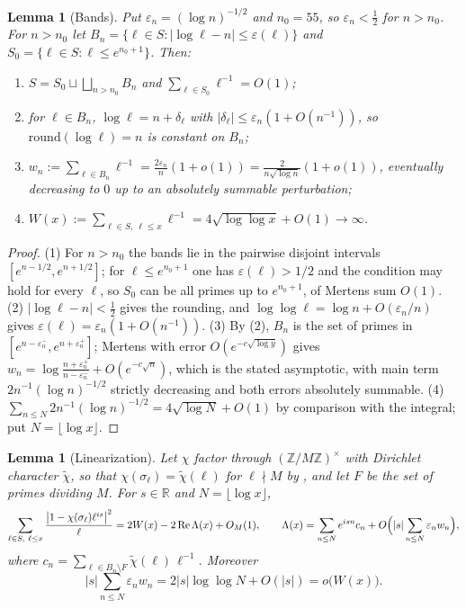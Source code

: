 \documentclass[11pt]{amsart}
\numberwithin{equation}{section}
\newtheorem{lemma}[theorem]{Lemma}
\theoremstyle{definition}
\theoremstyle{remark}
\newcommand{\Z}{\mathbb{Z}}
\newcommand{\R}{\mathbb{R}}
\begin{document}
\begin{lemma}[Bands]\label{lem:bands}
Put $\varepsilon_n=(\log n)^{-1/2}$ and $n_0=55$, so $\varepsilon_n<\tfrac12$ for $n>n_0$.
For $n>n_0$ let $B_n=\{\ell\in S:|\log\ell-n|\le\varepsilon(\ell)\}$ and
$S_0=\{\ell\in S:\ell\le e^{n_0+1}\}$. Then:
\begin{enumerate}
\item $S=S_0\sqcup\bigsqcup_{n>n_0}B_n$ and $\sum_{\ell\in S_0}\ell^{-1}=O(1)$;
\item for $\ell\in B_n$, $\log\ell=n+\delta_\ell$ with $|\delta_\ell|\le\varepsilon_n(1+O(n^{-1}))$,
so $\mathrm{round}(\log\ell)=n$ is constant on $B_n$;
\item $w_n:=\sum_{\ell\in B_n}\ell^{-1}=\frac{2\varepsilon_n}{n}(1+o(1))=\frac{2}{n\sqrt{\log n}}(1+o(1))$,
eventually decreasing to $0$ up to an absolutely summable perturbation;
\item $W(x):=\sum_{\ell\in S,\ \ell\le x}\ell^{-1}=4\sqrt{\log\log x}+O(1)\to\infty$.
\end{enumerate}
\end{lemma}

\begin{proof}
(1) For $n>n_0$ the bands lie in the pairwise disjoint intervals $[e^{n-1/2},e^{n+1/2}]$;
for $\ell\le e^{n_0+1}$ one has $\varepsilon(\ell)>1/2$ and the condition may hold for every
$\ell$, so $S_0$ can be all primes up to $e^{n_0+1}$, of Mertens sum $O(1)$.
(2) $|\log\ell-n|<\tfrac12$ gives the rounding, and
$\log\log\ell=\log n+O(\varepsilon_n/n)$ gives $\varepsilon(\ell)=\varepsilon_n(1+O(n^{-1}))$.
(3) By (2), $B_n$ is the set of primes in $[e^{n-\varepsilon_n^-},e^{n+\varepsilon_n^+}]$;
Mertens with error $O(e^{-c\sqrt{\log y}})$ gives
$w_n=\log\frac{n+\varepsilon_n^+}{n-\varepsilon_n^-}+O(e^{-c\sqrt n})$, which is the stated
asymptotic, with main term $2n^{-1}(\log n)^{-1/2}$ strictly decreasing and both errors
absolutely summable.
(4) $\sum_{n\le N}2n^{-1}(\log n)^{-1/2}=4\sqrt{\log N}+O(1)$ by comparison with the
integral; put $N=\lfloor\log x\rfloor$.
\end{proof}

\begin{lemma}[Linearization]\label{lem:lin}
Let $\chi$ factor through $(\Z/M\Z)^\times$ with Dirichlet character $\tilde\chi$, so that
$\chi(\sigma_\ell)=\tilde\chi(\ell)$ for $\ell\nmid M$ by \cite[Lem.~2.10(1)]{Main}, and let
$F$ be the set of primes dividing $M$. For $s\in\R$ and $N=\lfloor\log x\rfloor$,
\begin{equation}\label{eq:linear}
\sum_{\ell\in S,\ \ell\le x}\frac{\bigl|1-\chi(\sigma_\ell)\ell^{is}\bigr|^2}{\ell}
=2W(x)-2\operatorname{Re}\Lambda(x)+O_M(1),
\qquad
\Lambda(x)=\sum_{n\le N}e^{isn}c_n+O\Bigl(|s|\sum_{n\le N}\varepsilon_nw_n\Bigr),
\end{equation}
where $c_n=\sum_{\ell\in B_n\setminus F}\tilde\chi(\ell)\,\ell^{-1}$. Moreover
\begin{equation}\label{eq:err}
|s|\sum_{n\le N}\varepsilon_nw_n=2|s|\log\log N+O(|s|)=o\bigl(W(x)\bigr).
\end{equation}
\end{lemma}
\end{document}
